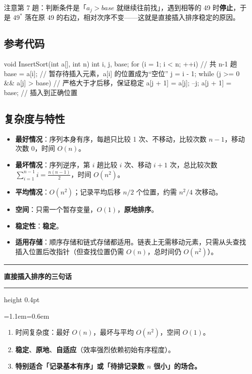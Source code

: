 \documentclass[11pt,openany,UTF8]{ctexbook}
\newcommand{\callouthead}[2]{%
  \par\addvspace{7pt}\noindent
  {\color{#1}\rule[-0.15em]{3pt}{1.05em}}\hspace{0.5em}%
  {\bfseries\color{#1}#2}\par\nobreak\vspace{-0.35em}%
  {\color{rulesep}\hrule height 0.4pt}\nobreak\vspace{0.45em}%
  \begingroup\small\setlength{\parindent}{0pt}%
  \leftskip=1.1em\rightskip=0.6em\noindent\ignorespaces}
\newcommand{\calloutend}{\par\endgroup\addvspace{7pt}}
\newenvironment{callkey}[1]{\callouthead{keybar}{#1}}{\calloutend}
\begin{document}
注意第 7 趟：判断条件是「$a_j>base$ 就继续往前找」，遇到相等的 49 时\textbf{停止}，于是 $49^*$ 落在原 49 的右边，相对次序不变——这就是直接插入排序稳定的原因。

\subsection{参考代码}

\begin{codebox}
void InsertSort(int a[], int n) {
    int i, j, base;
    for (i = 1; i < n; ++i) {      // 共 n-1 趟
        base = a[i];               // 暂存待插入元素，a[i] 的位置成为“空位”
        j = i - 1;
        while (j >= 0 && a[j] > base) {  // 严格大于才后移，保证稳定
            a[j + 1] = a[j];
            --j;
        }
        a[j + 1] = base;           // 插入到正确位置
    }
}
\end{codebox}

\subsection{复杂度与特性}

\begin{itemize}
\item \textbf{最好情况}：序列本身有序，每趟只比较 1 次、不移动，比较次数 $n-1$，移动次数 0，时间 $O(n)$。
\item \textbf{最坏情况}：序列逆序，第 $i$ 趟比较 $i$ 次、移动 $i+1$ 次，总比较次数 $\sum_{i=1}^{n-1}i=\frac{n(n-1)}{2}$，时间 $O(n^2)$。
\item \textbf{平均情况}：$O(n^2)$；记录平均后移 $n/2$ 个位置，约需 $n^2/4$ 次移动。
\item \textbf{空间}：只需一个暂存变量，$O(1)$，\textbf{原地排序}。
\item \textbf{稳定性}：\textbf{稳定}。
\item \textbf{适用存储}：顺序存储和链式存储都适用。链表上无需移动元素，只需从头查找插入位置后改指针（但查找位置仍需 $O(n)$，总时间仍 $O(n^2)$）。
\end{itemize}
\begin{callkey}{直接插入排序的三句话}
\begin{enumerate}
\item 时间复杂度：最好 $O(n)$，最坏与平均 $O(n^2)$，空间 $O(1)$。
\item \textbf{稳定}、\textbf{原地}、\textbf{自适应}（效率强烈依赖初始有序程度）。
\item \textbf{特别适合「记录基本有序」或「待排记录数 $n$ 很小」的场合。}
\end{enumerate}
\end{callkey}
\end{document}
